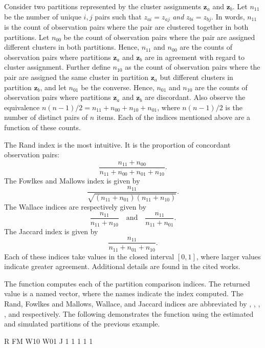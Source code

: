 \documentclass[article, nojss]{jss}
\newcommand{\bz}{\boldsymbol{z}}
\begin{document}
Consider two partitions represented by the cluster assignments $\bz_a$ and $\bz_b$. Let $n_{11}$ be the number of unique ${i,j}$ pairs such that $z_{ai} = z_{aj}$ {\it and} $z_{bi} = z_{bj}$. In words, $n_{11}$ is the count of observation pairs where the pair are clustered together in both partitions. Let $n_{00}$ be the count of observation pairs where the pair are assigned different clusters in both partitions. Hence, $n_{11}$ and $n_{00}$ are the counts of observation pairs where partitions $\bz_a$ and $\bz_b$ are in agreement with regard to cluster assignment. Further define $n_{10}$ as the count of observation pairs where the pair are assigned the same cluster in partition $\bz_a$ but different clusters in partition $\bz_b$, and let $n_{01}$ be the converse. Hence, $n_{01}$ and $n_{10}$ are the counts of observation pairs where partitions $\bz_a$ and $\bz_b$ are discordant. Also observe the equivalence $n(n-1)/2 = n_{11} + n_{00} + n_{10} + n_{01}$, where $n(n-1)/2$ is the number of distinct pairs of $n$ items. Each of the indices mentioned above are a function of these counts.

The Rand index is the most intuitive. It is the proportion of concordant observation pairs: \[\frac{n_{11}+n_{00}}{n_{11}+n_{00}+n_{01}+n_{10}}.\] The Fowlkes and Mallows index is given by \[\frac{n_{11}}{\sqrt{(n_{11}+n_{01})(n_{11}+n_{10})}}.\] The Wallace indices are respectively given by \[\frac{n_{11}}{n_{11}+n_{10}} \quad \mathrm{and} \quad \frac{n_{11}}{n_{11}+n_{01}}.\] The Jaccard index is given by \[\frac{n_{11}}{n_{11}+n_{01}+n_{10}}.\] Each of these indices take values in the closed interval $[0,1]$, where larger values indicate greater agreement. Additional details are found in the cited works.

The  function computes each of the partition comparison indices. The returned value is a named vector, where the names indicate the index computed. The Rand, Fowlkes and Mallows, Wallace, and Jaccard indices are abbreviated by , , , , and  respectively. The following demonstrates the  function using the estimated and simulated partitions of the previous example.
\begin{Schunk}
\begin{Soutput}
  R  FM W10 W01   J 
  1   1   1   1   1 
\end{Soutput}
\end{Schunk}
\end{document}
